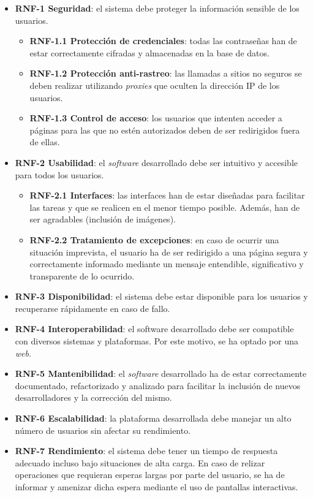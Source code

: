 \begin{itemize}
	\item \textbf{RNF-1 Seguridad}: el sistema debe proteger la información sensible de los usuarios.
	\begin{itemize}
		\item \textbf{RNF-1.1 Protección de credenciales}: todas las contraseñas han de estar correctamente cifradas y almacenadas en la base de datos.
		\item \textbf{RNF-1.2 Protección anti-rastreo}: las llamadas a sitios no seguros se deben realizar utilizando \textit{proxies} que oculten la dirección IP de los usuarios.
		\item \textbf{RNF-1.3 Control de acceso}: los usuarios que intenten acceder a páginas para las que no estén autorizados deben de ser redirigidos fuera de ellas.
	\end{itemize}
	\item \textbf{RNF-2 Usabilidad}: el \textit{software} desarrollado debe ser intuitivo y accesible para todos los usuarios.
	\begin{itemize}
		\item \textbf{RNF-2.1 Interfaces}: las interfaces han de estar diseñadas para facilitar las tareas y que se realicen en el menor tiempo posible. Además, han de ser agradables (inclusión de imágenes).
		\item \textbf{RNF-2.2 Tratamiento de excepciones}: en caso de ocurrir una situación imprevista, el usuario ha de ser redirigido a una página segura y correctamente informado mediante un mensaje entendible, significativo y transparente de lo ocurrido.
	\end{itemize}
	\item \textbf{RNF-3 Disponibilidad}: el sistema debe estar disponible para los usuarios y recuperarse rápidamente en caso de fallo.
	\item \textbf{RNF-4 Interoperabilidad}: el software desarrollado debe ser compatible con diversos sistemas y plataformas. Por este motivo, se ha optado por una \textit{web}.
	\item \textbf{RNF-5 Mantenibilidad}: el \textit{software} desarrollado ha de estar correctamente documentado, refactorizado y analizado para facilitar la inclusión de nuevos desarrolladores y la corrección del mismo.
	\item \textbf{RNF-6 Escalabilidad}: la plataforma desarrollada debe manejar un alto número de usuarios sin afectar su rendimiento.
	\item \textbf{RNF-7 Rendimiento}: el sistema debe tener un tiempo de respuesta adecuado incluso bajo situaciones de alta carga. En caso de relizar operaciones que requieran esperas largas por parte del usuario, se ha de informar y amenizar dicha espera mediante el uso de pantallas interactivas.

\end{itemize}
